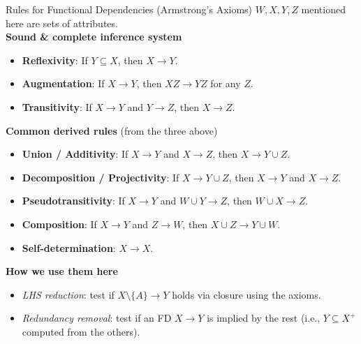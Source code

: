 \documentclass{beamer}
\begin{document}
\begin{frame}{Rules for Functional Dependencies (Armstrong's Axioms)}
\scriptsize
$W, X, Y, Z$ mentioned here are \alert{sets} of attributes.\\
\textbf{Sound \& complete inference system}
\begin{itemize}\setlength\itemsep{0.25em}
  \item \textbf{Reflexivity}:\; If $Y\subseteq X$, then $X \to Y$.
  \item \textbf{Augmentation}:\; If $X \to Y$, then $XZ \to YZ$ for any $Z$.
  \item \textbf{Transitivity}:\; If $X \to Y$ and $Y \to Z$, then $X \to Z$.
\end{itemize}

\medskip
\textbf{Common derived rules} (from the three above)
\begin{itemize}\setlength\itemsep{0.25em}
  \item \textbf{Union / Additivity}:\; If $X \to Y$ and $X \to Z$, then $X \to Y\cup Z$.
  \item \textbf{Decomposition / Projectivity}:\; If $X \to Y\cup Z$, then $X \to Y$ and $X \to Z$.
  \item \textbf{Pseudotransitivity}:\; If $X \to Y$ and $W\cup Y \to Z$, then $W\cup X \to Z$.
  \item \textbf{Composition}:\; If $X \to Y$ and $Z \to W$, then $X\cup Z \to Y\cup W$.
  \item \textbf{Self-determination}:\; $X \to X$.
\end{itemize}

\medskip
\textbf{How we use them here}
\begin{itemize}\setlength\itemsep{0.25em}
  \item \emph{LHS reduction}: test if $X\setminus\{A\}\to Y$ holds via closure using the axioms.
  \item \emph{Redundancy removal}: test if an FD $X\to Y$ is implied by the rest (i.e., $Y\subseteq X^+$ computed from the others).
\end{itemize}
\end{frame}
\end{document}
